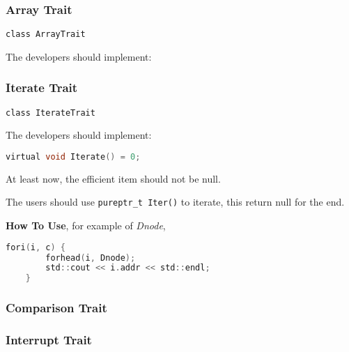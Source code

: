 

\subsubsection{Array Trait}

\verb|class ArrayTrait|

The developers should implement:

\lstset{style=GlobalCxx}

\subsubsection{Iterate Trait}

\verb|class IterateTrait|

The developers should implement:

\lstset{style=GlobalC}
\begin{lstlisting}[language=C]
	virtual void Iterate() = 0;
\end{lstlisting}

At least now, the efficient item should not be null.

The users should use \verb|pureptr_t Iter()| to iterate, this return null for the end.

\textbf{How To Use}, for example of \textit{Dnode},

\lstset{style=GlobalC}
\begin{lstlisting}[language=C]
	fori(i, c) {
		forhead(i, Dnode);
		std::cout << i.addr << std::endl;
	}
\end{lstlisting}

\subsubsection{Comparison Trait}

\subsubsection{Interrupt Trait}



